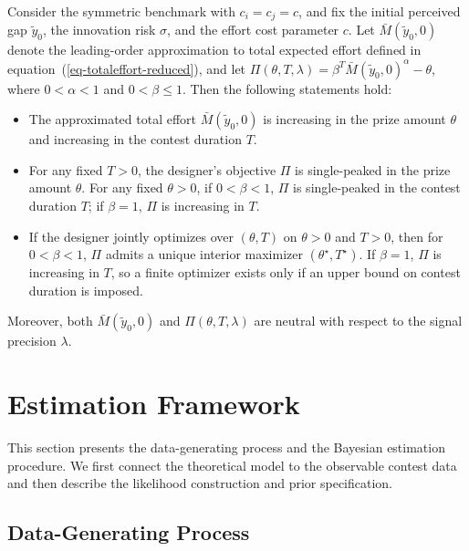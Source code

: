 \documentclass[mnsc]{informs3}
\begin{document}
\begin{proposition}\label{prop-monotonicity-M}
Consider the symmetric benchmark with $c_i=c_j=c$, and fix the initial perceived
gap $\tilde y_0$, the innovation risk $\sigma$, and the effort cost parameter
$c$. Let $\bar M(\tilde y_0,0)$ denote the leading-order approximation to total
expected effort defined in equation~(\ref{eq-totaleffort-reduced}), and let
$\Pi(\theta,T,\lambda)=\beta^T \bar{M}(\tilde y_0,0)^\alpha-\theta$, where
$0<\alpha<1$ and $0<\beta\leq 1$. Then the following statements hold:
\begin{itemize}
	\item [(1)] The approximated total effort $\bar{M}(\tilde y_0,0)$ is increasing in the prize amount $\theta$ and increasing in the contest duration $T$.

	\item [(2)] For any fixed $T>0$, the designer's objective $\Pi$ is single-peaked in the prize amount $\theta$. For any fixed $\theta>0$, if $0<\beta<1$, $\Pi$ is single-peaked in the contest duration $T$; if $\beta=1$, $\Pi$ is increasing in $T$.

	\item [(3)] If the designer jointly optimizes over $(\theta,T)$ on $\theta>0$ and $T>0$, then for $0<\beta<1$, $\Pi$ admits a unique interior maximizer $(\theta^\star,T^\star)$. If $\beta=1$, $\Pi$ is increasing in $T$, so a finite optimizer exists only if an upper bound on contest duration is imposed.
\end{itemize}
Moreover, both $\bar M(\tilde y_0,0)$ and $\Pi(\theta,T,\lambda)$ are neutral with respect to
the signal precision $\lambda$.
\end{proposition}






\section{Estimation Framework}\label{sect-bayes-framework}

This section presents the data-generating process and the Bayesian estimation procedure.
We first connect the theoretical model to the observable contest data and then describe the likelihood construction and prior specification.

\subsection{Data-Generating Process}
\end{document}
